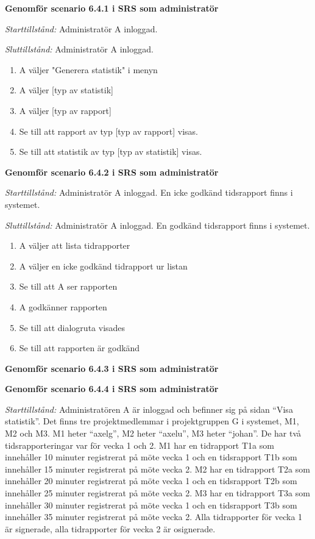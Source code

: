 \documentclass[a4paper]{article}
\begin{document}
\begin{ST}

\item
\textbf{Genomför scenario 6.4.1 i SRS som administratör}

\emph{Starttillstånd:} Administratör A inloggad.

\emph{Sluttillstånd:} Administratör A inloggad.

\begin{enumerate}
\item
A väljer "Generera statistik" i menyn
\item
A väljer [typ av statistik]
\item 
A väljer [typ av rapport]
\item
Se till att rapport av typ [typ av rapport] visas.
\item
Se till att statistik av typ [typ av statistik] visas.
\end{enumerate}

\item
\textbf{Genomför scenario 6.4.2 i SRS som administratör}

\emph{Starttillstånd:} Administratör A inloggad. En icke godkänd tidsrapport finns i systemet.

\emph{Sluttillstånd:} Administratör A inloggad. En godkänd tidsrapport finns i systemet.

\begin{enumerate}

\item
A väljer att lista tidrapporter
\item
A väljer en icke godkänd tidrapport ur listan
\item
Se till att A ser rapporten
\item
A godkänner rapporten
\item
Se till att dialogruta visades
\item
Se till att rapporten är godkänd

\end{enumerate}

\item
\textbf{Genomför scenario 6.4.3 i SRS som administratör}

\item
\textbf{Genomför scenario 6.4.4 i SRS som administratör}

\emph{Starttillstånd:} Administratören A är inloggad och befinner sig på sidan ``Visa statistik''. Det finns tre projektmedlemmar i projektgruppen G i systemet, M1, M2 och M3. M1 heter ``axelg'', M2 heter ``axelu'', M3 heter ``johan''. De har två tidsrapporteringar var för vecka 1 och 2. M1 har en tidrapport T1a som innehåller 10 minuter registrerat på möte vecka 1 och en tidsrapport T1b som innehåller 15 minuter registrerat på möte vecka 2. M2 har en tidrapport T2a som innehåller 20 minuter registrerat på möte vecka 1 och en tidsrapport T2b som innehåller 25 minuter registrerat på möte vecka 2. M3 har en tidrapport T3a som innehåller 30 minuter registrerat på möte vecka 1 och en tidsrapport T3b som innehåller 35 minuter registrerat på möte vecka 2. Alla tidrapporter för vecka 1 är signerade, alla tidrapporter för vecka 2 är osignerade.


\end{ST}
\end{document}
